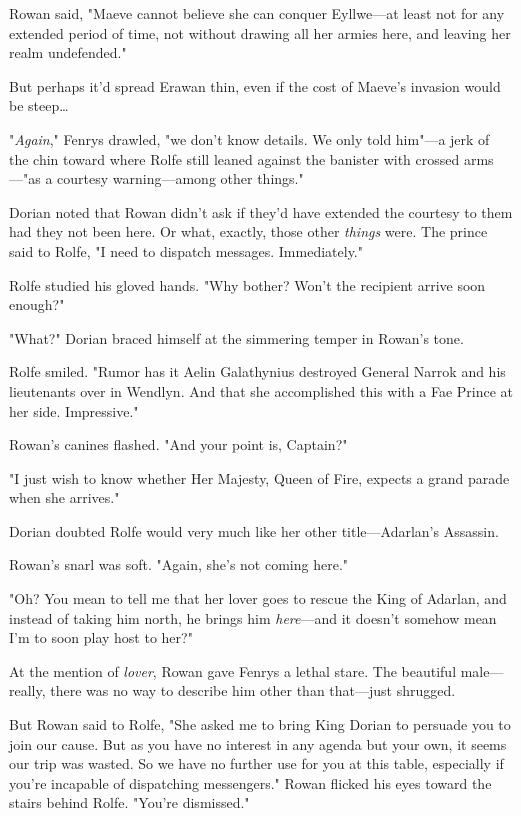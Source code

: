 Rowan said, "Maeve cannot believe she can conquer Eyllwe---at least not for any extended period of time, not without drawing all her armies here, and leaving her realm undefended."

But perhaps it'd spread Erawan thin, even if the cost of Maeve's invasion would be steep\ldots{}

"\emph{Again}," Fenrys drawled, "we don't know details.
We only told him"---a jerk of the chin toward where Rolfe still leaned against the banister with crossed arms---"as a courtesy warning---among other things."

Dorian noted that Rowan didn't ask if they'd have extended the courtesy to them had they not been here.
Or what, exactly, those other \emph{things} were.
The prince said to Rolfe, "I need to dispatch messages.
Immediately."

Rolfe studied his gloved hands.
"Why bother?
Won't the recipient arrive soon enough?"

"What?"
Dorian braced himself at the simmering temper in Rowan's tone.

Rolfe smiled.
"Rumor has it Aelin Galathynius destroyed General Narrok and his lieutenants over in Wendlyn.
And that she accomplished this with a Fae Prince at her side.
Impressive."

Rowan's canines flashed.
"And your point is, Captain?"

"I just wish to know whether Her Majesty, Queen of Fire, expects a grand parade when she arrives."

Dorian doubted Rolfe would very much like her other title---Adarlan's Assassin.

Rowan's snarl was soft.
"Again, she's not coming here."

"Oh?
You mean to tell me that her lover goes to rescue the King of Adarlan, and instead of taking him north, he brings him \emph{here}---and it doesn't somehow mean I'm to soon play host to her?"

At the mention of \emph{lover}, Rowan gave Fenrys a lethal stare.
The beautiful male---really, there was no way to describe him other than that---just shrugged.

But Rowan said to Rolfe, "She asked me to bring King Dorian to persuade you to join our cause.
But as you have no interest in any agenda but your own, it seems our trip was wasted.
So we have no further use for you at this table, especially if you're incapable of dispatching messengers."
Rowan flicked his eyes toward the stairs behind Rolfe.
"You're dismissed."

